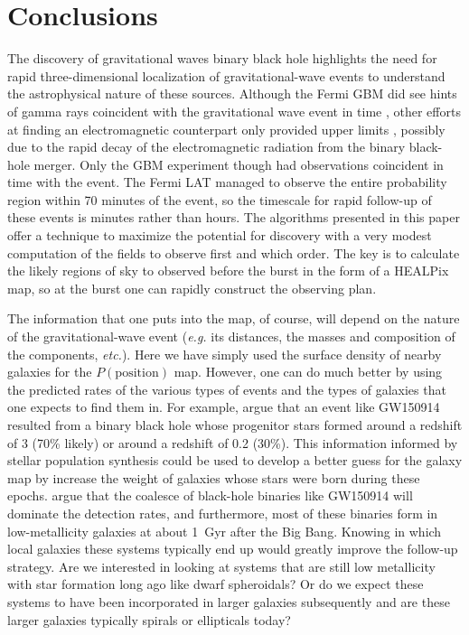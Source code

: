 \documentclass[useAMS,usenatbib]{mn2e}
\begin{document}
\section{Conclusions}

The discovery of gravitational waves binary black hole highlights the
need for rapid three-dimensional localization of gravitational-wave
events to understand the astrophysical nature of these sources.
Although the Fermi GBM did see hints of gamma rays coincident with the
gravitational wave event in time \citep{2016arXiv160203920C}, other
efforts at finding an electromagnetic counterpart only provided upper limits
\citep[e.g][]{2016arXiv160204198S,2016arXiv160204156S,2016arXiv160204488F},
possibly due to the rapid decay of the electromagnetic radiation from
the binary black-hole merger.  Only the GBM experiment though had
observations coincident in time with the event.  The Fermi LAT managed
to observe the entire probability region within 70 minutes of the
event, so the timescale for rapid follow-up of these events is minutes
rather than hours.  The algorithms presented in this paper offer a
technique to maximize the potential for discovery with a very modest
computation of the fields to observe first and which order.  The key
is to calculate the likely regions of sky to observed before the burst
in the form of a HEALPix map, so at the burst one can rapidly
construct the observing plan.

The information that one puts into the map, of course, will depend on
the nature of the gravitational-wave event ({\em e.g.} its distances,
the masses and composition of the components, {\em etc.}).  Here we
have simply used the surface density of nearby galaxies for the
$P(\mathrm{position})$ map.  However, one can do much better by using
the predicted rates of the various types of events and the types of
galaxies that one expects to find them in.  For example,
\citet{2016arXiv160204531B} argue that an event like GW150914 resulted
from a binary black hole whose progenitor stars formed around a
redshift of 3 (70\% likely) or around a redshift of 0.2 (30\%).  This
information informed by stellar population synthesis could be used to
develop a better guess for the galaxy map by increase the weight of
galaxies whose stars were born during these epochs.
\citet{2015ApJ...806..263D} argue that the coalesce of black-hole
binaries like GW150914 will dominate the detection rates, and
furthermore, most of these binaries form in low-metallicity galaxies
at about 1~Gyr after the Big Bang.  Knowing in which local galaxies
these systems typically end up would greatly improve the follow-up
strategy.  Are we interested in looking at systems that are still low
metallicity with star formation long ago like dwarf spheroidals?  Or
do we expect these systems to have been incorporated in larger galaxies
subsequently and are these larger galaxies typically spirals or
ellipticals today?
\end{document}
